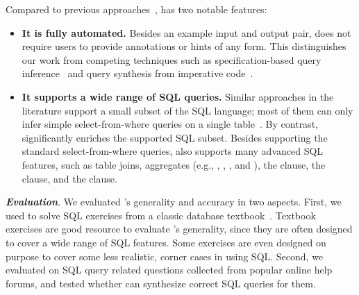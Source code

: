 Compared to previous approaches~\cite{Zloof:1975,
Tran:2009, DasSarma:2010, abs-1208-2013}, \ourtool has two notable features:

\begin{itemize}
\item \textbf{It is fully automated.} Besides
an example input and output pair,
\ourtool does not require users to provide
annotations or hints of any form. 
This distinguishes our work from competing techniques such as
specification-based query inference~\cite{Zloof:1975} and
query synthesis from imperative code~\cite{abs-1208-2013}.

\item \textbf{It supports a wide range of SQL queries.}
Similar approaches in the literature support
a small subset of the SQL language; most of them
can only infer simple select-from-where
queries on a single table~\cite{Zloof:1975, DasSarma:2010, Tran:2009, DasSarma:2010, abs-1208-2013}. By contrast, 
\ourtool significantly enriches the supported SQL subset.
Besides supporting the standard select-from-where
queries, \ourtool also supports many advanced
SQL features, such as table joins,
aggregates (e.g., , , ,
and ), the  clause,
the  clause, and the  clause.
\end{itemize}






\vspace{1mm}
\noindent \textbf{\textit{Evaluation}}.
We evaluated \ourtool's generality and accuracy
in two aspects. First, we used \ourtool to solve
\exnum SQL exercises from a classic database textbook~\cite{cowbook}. 
Textbook exercises are good resource
to evaluate \ourtool's generality, since they
are often designed to cover a wide range of SQL features.
Some exercises are even designed on purpose to cover some less realistic,
corner cases in using SQL.
Second, we evaluated \ourtool on \exnum SQL query related
questions collected from popular online help forums, and tested whether
\ourtool can synthesize correct SQL queries for them.

